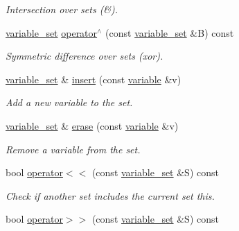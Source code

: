 \begin{DoxyCompactItemize}
\begin{DoxyCompactList}\small\item\em Intersection over sets (\&). \end{DoxyCompactList}\item 
\hyperlink{classmerlin_1_1variable__set}{variable\+\_\+set} \hyperlink{classmerlin_1_1variable__set_a395a46321acea6fe102c661a67cd0879}{operator$^\wedge$} (const \hyperlink{classmerlin_1_1variable__set}{variable\+\_\+set} \&B) const 
\begin{DoxyCompactList}\small\item\em Symmetric difference over sets (xor). \end{DoxyCompactList}\item 
\hypertarget{classmerlin_1_1variable__set_a03e6bff676ce033ec3cd28c141f43828}{}\hyperlink{classmerlin_1_1variable__set}{variable\+\_\+set} \& \hyperlink{classmerlin_1_1variable__set_a03e6bff676ce033ec3cd28c141f43828}{insert} (const \hyperlink{classmerlin_1_1variable}{variable} \&v)\label{classmerlin_1_1variable__set_a03e6bff676ce033ec3cd28c141f43828}

\begin{DoxyCompactList}\small\item\em Add a new variable to the set. \end{DoxyCompactList}\item 
\hypertarget{classmerlin_1_1variable__set_a385b8b219c5dfa11f181f21da30bb5a2}{}\hyperlink{classmerlin_1_1variable__set}{variable\+\_\+set} \& \hyperlink{classmerlin_1_1variable__set_a385b8b219c5dfa11f181f21da30bb5a2}{erase} (const \hyperlink{classmerlin_1_1variable}{variable} \&v)\label{classmerlin_1_1variable__set_a385b8b219c5dfa11f181f21da30bb5a2}

\begin{DoxyCompactList}\small\item\em Remove a variable from the set. \end{DoxyCompactList}\item 
\hypertarget{classmerlin_1_1variable__set_aa88748563d3cc40889a07e6ca1775503}{}bool \hyperlink{classmerlin_1_1variable__set_aa88748563d3cc40889a07e6ca1775503}{operator$<$$<$} (const \hyperlink{classmerlin_1_1variable__set}{variable\+\_\+set} \&S) const \label{classmerlin_1_1variable__set_aa88748563d3cc40889a07e6ca1775503}

\begin{DoxyCompactList}\small\item\em Check if another set includes the current set {\itshape this}. \end{DoxyCompactList}\item 
\hypertarget{classmerlin_1_1variable__set_ad6f331c4956f7d0d2fc9831d5e0a5205}{}bool \hyperlink{classmerlin_1_1variable__set_ad6f331c4956f7d0d2fc9831d5e0a5205}{operator$>$$>$} (const \hyperlink{classmerlin_1_1variable__set}{variable\+\_\+set} \&S) const \label{classmerlin_1_1variable__set_ad6f331c4956f7d0d2fc9831d5e0a5205}


\end{DoxyCompactItemize}
